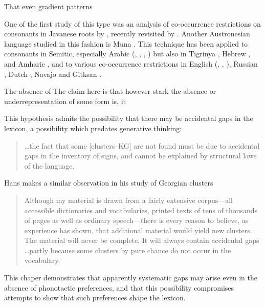 That even gradient patterns 

One of the first study of this type was an analysis of co-occurrence restrictions on consonants in Javanese roots by \citet{Mester1988}, recently revisited by \citet{Graff2011}. 
Another Austronesian language studied in this fashion is Muna \citep{Coetzee2008a,Anttila2008}.
This technique has been applied to consonants in Semitic, especially Arabic 
(\citealt{McCarthy1988,McCarthy1994}, \citealt{Pierrehumbert1993}, \citealt{Frisch1996,Frisch2004}, \citealt{Coetzee2008a}) but also in Tigrinya \citep{Buckley1997}, Hebrew \citep{Berent2003}, and Amharic \citep{Colavin2010}, and to various co-occurrence restrictions in English (\citealt{Berkley1994b,Berkley1994a}, \citealt{Pierrehumbert1994}, \citealt{Coetzee2008b}), Russian \citep{Padgett1992}, Dutch \citep{Graff2011}, Navajo \citep{Martin2007,Martin2011} and Gitksan \citep{Brown2010}.

The absence of 
The claim here is that however stark the absence or underrepresentation of some form is, it 

This hypothesis admits the possibility that there may be accidental gaps in the lexicon, a possibility which predates generative thinking:

\begin{quote}
\ldots{}the fact that some [clusters--KG] are not found must be due to accidental gaps in the inventory of signs, and cannot be explained by structural laws of the language. \citep[][16]{Fischer-Jorgensen1952}
\end{quote}

\noindent
Hans \citeauthor{Vogt1954} makes a similar observation in his study of Georgian clusters

\begin{quote}
Although my material is drawn from a fairly extensive corpus---all accessible dictionaries and vocabularies, printed texts of tens of thousands of pages as well as ordinary speech---there is every reason to believe, as experience has shown, that additional material would yield new clusters. The material will never be complete. It will always contain accidental gaps \ldots partly because some clusters by pure chance do not occur in the vocabulary. \citep[][30]{Vogt1954}
\end{quote}

\citet{Chomsky1965}

This chaper demonstrates that apparently systematic gaps may arise even in the absence of phonotactic preferences, and that this possibility compromises attempts to show that such preferences shape the lexicon. 

